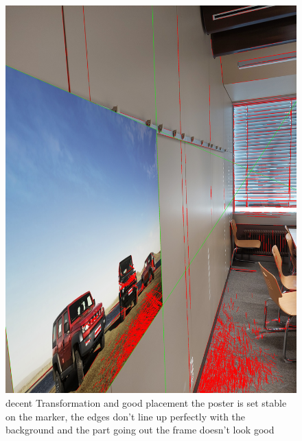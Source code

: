 \documentclass[a4paper,twocolumn]{article}
\begin{document}
    \begin{figure}[h!]
    \centering
    \includegraphics[width=0.9\columnwidth]{img/20221115_113437.jpg} %
    \caption{decent Transformation and good placement the poster is set stable on the marker, the edges don't line up perfectly with the background and the part going out the frame doesn't look good}
    \label{fig:20221115_113437.jpg}
    \end{figure}
    
    
    
\end{document}
